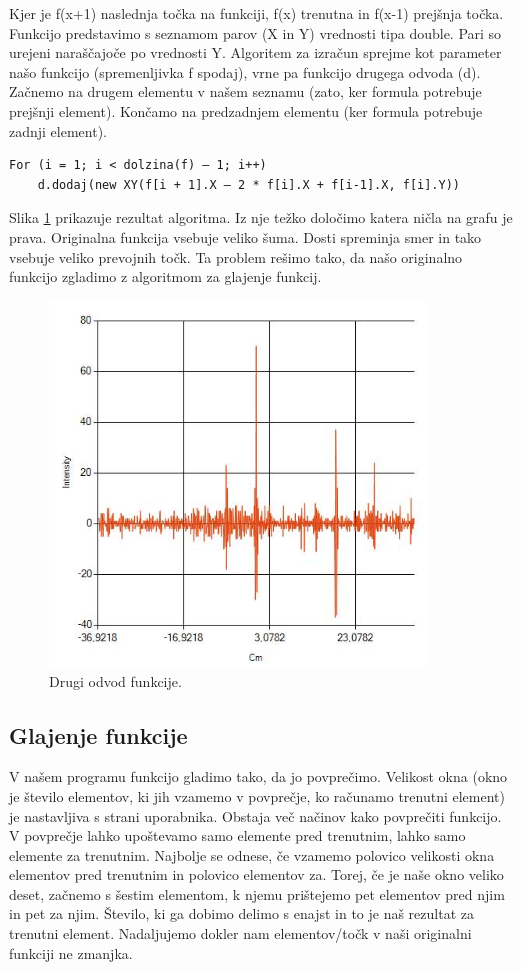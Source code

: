 \documentclass[oneside, a4paper, 12pt]{book}
\begin{document}
Kjer je f(x+1) naslednja točka na funkciji, f(x) trenutna in f(x-1) prejšnja točka. Funkcijo predstavimo s seznamom parov (X in Y) vrednosti tipa double. Pari so urejeni naraščajoče po vrednosti Y. Algoritem za izračun sprejme kot parameter našo funkcijo (spremenljivka f spodaj), vrne pa funkcijo drugega odvoda (d). Začnemo na drugem elementu v našem seznamu (zato, ker formula potrebuje prejšnji element). Končamo na predzadnjem elementu (ker formula potrebuje zadnji element).

\begin{verbatim}
For (i = 1; i < dolzina(f) – 1; i++) 
    d.dodaj(new XY(f[i + 1].X – 2 * f[i].X + f[i-1].X, f[i].Y))
\end{verbatim}

Slika \ref{pic:d2} prikazuje rezultat algoritma. Iz nje težko določimo katera ničla na grafu je prava. Originalna funkcija vsebuje veliko šuma. Dosti spreminja smer in tako vsebuje veliko prevojnih točk. Ta problem rešimo tako, da našo originalno funkcijo zgladimo z algoritmom za glajenje funkcij.


\begin{figure}
\begin{center}
\includegraphics[width=10cm]{slike/drugi-odvod-1.jpg}
\end{center}
\caption{Drugi odvod funkcije.}
\label{pic:d2}
\end{figure}

\subsection{Glajenje funkcije}
V našem programu funkcijo gladimo tako, da jo povprečimo. Velikost okna (okno je število elementov, ki jih vzamemo v povprečje, ko računamo trenutni element) je nastavljiva s strani uporabnika. Obstaja več načinov kako povprečiti funkcijo. V povprečje lahko upoštevamo samo elemente pred trenutnim, lahko samo elemente za trenutnim. Najbolje se odnese, če vzamemo polovico velikosti okna elementov pred trenutnim in polovico elementov za. Torej, če je naše okno veliko deset, začnemo s šestim elementom, k njemu prištejemo pet elementov pred njim in pet za njim. Število, ki ga dobimo delimo s enajst in to je naš rezultat za trenutni element. Nadaljujemo dokler nam elementov/točk v naši originalni funkciji ne zmanjka. 
\end{document}
